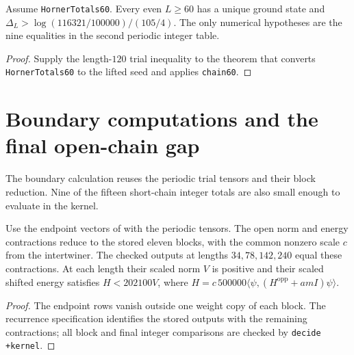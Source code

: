 \begin{theorem}
  \label{thm:kernel-gap60-integers}
  \leanok
  Assume \texttt{HornerTotals60}. Every even \(L\ge60\) has a unique ground state and
  \(\Delta_L>\log(116321/100000)/(105/4)\).
  The only numerical hypotheses are the nine equalities in the second periodic integer table.
\end{theorem}
\begin{proof}
  \leanok
  Supply the length-\(120\) trial inequality to the theorem that converts
  \texttt{HornerTotals60} to the lifted seed and applies \texttt{chain60}.
\end{proof}

\section{Boundary computations and the final open-chain gap}

The boundary calculation reuses the periodic trial tensors and their block reduction.
Nine of the fifteen short-chain integer totals are also small enough to evaluate in the kernel.

\begin{lemma}
  \label{lem:kernel-open-trial-computation}
  \leanok
  Use the endpoint vectors of \cite[Appendix B]{OpenAIBoundary} with the periodic tensors.
  The open norm and energy contractions reduce to the stored eleven blocks, with the common
  nonzero scale \(c\) from the intertwiner.
  The checked outputs at lengths \(34,78,142,240\) equal these contractions.
  At each length their scaled norm \(V\) is positive and their scaled shifted energy
  satisfies \(H<202100V\), where \(H=c\,500000\langle\psi,(H^{\mathrm{opp}}+amI)\psi\rangle\).
\end{lemma}
\begin{proof}
  \leanok
  The endpoint rows vanish outside one weight copy of each block.
  The recurrence specification identifies the stored outputs with the remaining contractions;
  all block and final integer comparisons are checked by \texttt{decide +kernel}.
\end{proof}

